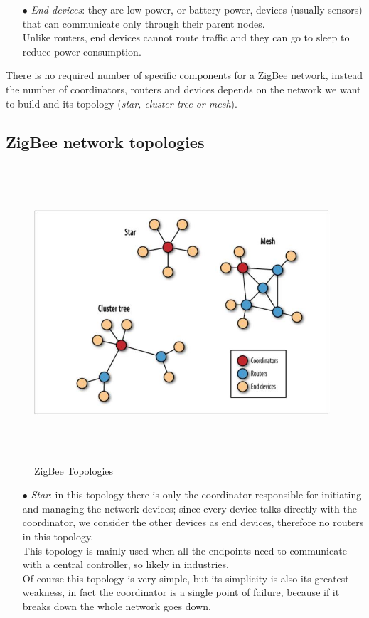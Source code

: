 \documentclass[12pt]{report}
\begin{document}
{{\begin{itemize}
\item[$\bullet$] \emph{End devices}: they are low-power, or battery-power, devices (usually sensors) that can communicate only through their parent nodes.\\
Unlike routers, end devices cannot route traffic and they can go to sleep to reduce power consumption.
\end{itemize}

There is no required number of specific components for a ZigBee network, instead the number of coordinators, routers and devices depends on the network we want to build and its topology (\emph{star, cluster tree or mesh}).

\subsection{ZigBee network topologies}

\begin{figure}[H]
\includegraphics[width=11cm,height=11cm,keepaspectratio]{zigbee_topologies}
\centering
\caption{ZigBee Topologies}
\end{figure}

\begin{itemize}
\setlength{\itemindent}{+4mm}
\item[$\bullet$] \emph{Star}: in this topology there is only the coordinator responsible for initiating and managing the network devices; since every device talks directly with the coordinator, we consider the other devices as end devices, therefore no routers in this topology.\\
This topology is mainly used when all the endpoints need to communicate with a central controller, so likely in industries.\\
Of course this topology is very simple, but its simplicity is also its greatest weakness, in fact the coordinator is a single point of failure, because if it breaks down the whole network goes down.


\end{itemize}}}
\end{document}
